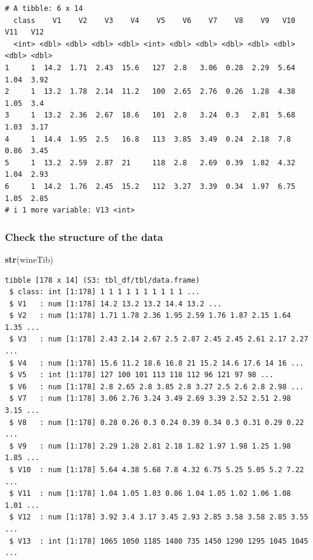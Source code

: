 \documentclass[
]{article}
\newenvironment{Shaded}{\begin{snugshade}}{\end{snugshade}}
\newcommand{\FunctionTok}[1]{\textcolor[rgb]{0.13,0.29,0.53}{\textbf{#1}}}
\newcommand{\NormalTok}[1]{#1}
\begin{document}
\begin{verbatim}
# A tibble: 6 x 14
  class    V1    V2    V3    V4    V5    V6    V7    V8    V9   V10   V11   V12
  <int> <dbl> <dbl> <dbl> <dbl> <int> <dbl> <dbl> <dbl> <dbl> <dbl> <dbl> <dbl>
1     1  14.2  1.71  2.43  15.6   127  2.8   3.06  0.28  2.29  5.64  1.04  3.92
2     1  13.2  1.78  2.14  11.2   100  2.65  2.76  0.26  1.28  4.38  1.05  3.4 
3     1  13.2  2.36  2.67  18.6   101  2.8   3.24  0.3   2.81  5.68  1.03  3.17
4     1  14.4  1.95  2.5   16.8   113  3.85  3.49  0.24  2.18  7.8   0.86  3.45
5     1  13.2  2.59  2.87  21     118  2.8   2.69  0.39  1.82  4.32  1.04  2.93
6     1  14.2  1.76  2.45  15.2   112  3.27  3.39  0.34  1.97  6.75  1.05  2.85
# i 1 more variable: V13 <int>
\end{verbatim}

\subsubsection{Check the structure of the
data}\label{check-the-structure-of-the-data}

\begin{Shaded}
\begin{Highlighting}[]
\FunctionTok{str}\NormalTok{(wineTib)}
\end{Highlighting}
\end{Shaded}

\begin{verbatim}
tibble [178 x 14] (S3: tbl_df/tbl/data.frame)
 $ class: int [1:178] 1 1 1 1 1 1 1 1 1 1 ...
 $ V1   : num [1:178] 14.2 13.2 13.2 14.4 13.2 ...
 $ V2   : num [1:178] 1.71 1.78 2.36 1.95 2.59 1.76 1.87 2.15 1.64 1.35 ...
 $ V3   : num [1:178] 2.43 2.14 2.67 2.5 2.87 2.45 2.45 2.61 2.17 2.27 ...
 $ V4   : num [1:178] 15.6 11.2 18.6 16.8 21 15.2 14.6 17.6 14 16 ...
 $ V5   : int [1:178] 127 100 101 113 118 112 96 121 97 98 ...
 $ V6   : num [1:178] 2.8 2.65 2.8 3.85 2.8 3.27 2.5 2.6 2.8 2.98 ...
 $ V7   : num [1:178] 3.06 2.76 3.24 3.49 2.69 3.39 2.52 2.51 2.98 3.15 ...
 $ V8   : num [1:178] 0.28 0.26 0.3 0.24 0.39 0.34 0.3 0.31 0.29 0.22 ...
 $ V9   : num [1:178] 2.29 1.28 2.81 2.18 1.82 1.97 1.98 1.25 1.98 1.85 ...
 $ V10  : num [1:178] 5.64 4.38 5.68 7.8 4.32 6.75 5.25 5.05 5.2 7.22 ...
 $ V11  : num [1:178] 1.04 1.05 1.03 0.86 1.04 1.05 1.02 1.06 1.08 1.01 ...
 $ V12  : num [1:178] 3.92 3.4 3.17 3.45 2.93 2.85 3.58 3.58 2.85 3.55 ...
 $ V13  : int [1:178] 1065 1050 1185 1480 735 1450 1290 1295 1045 1045 ...
\end{verbatim}
\end{document}
